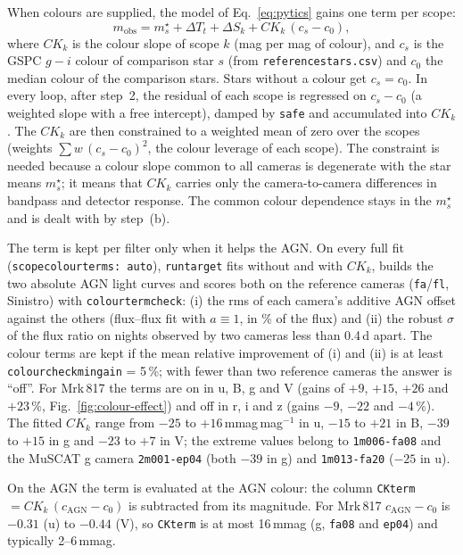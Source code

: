 \documentclass[10pt,a4paper,oneside]{report}
\renewcommand{\_}{\oldunderscore\allowbreak}
\begin{document}
When colours are supplied, the model of Eq.~\ref{eq:pytics} gains one term per scope:
\begin{equation}
  m_\mathrm{obs} = m^\star_s + \Delta T_t + \Delta S_k + CK_k\,(c_s - c_0) ,
  \label{eq:ck}
\end{equation}
where $CK_k$ is the colour slope of scope $k$ (mag per mag of colour), and $c_s$ is the GSPC $g-i$ colour of comparison star $s$ (from \texttt{reference\_stars.csv}) and
$c_0$ the median colour of the comparison stars. Stars without a colour get $c_s = c_0$. In every
loop, after step~2, the residual of each scope is regressed on $c_s - c_0$ (a weighted slope with a
free intercept), damped by \texttt{safe} and accumulated into $CK_k$. The $CK_k$ are then constrained
to a weighted mean of zero over the scopes (weights $\sum w\,(c_s-c_0)^2$, the colour leverage of each
scope). The constraint is needed because a colour slope common to all cameras is degenerate with the
star means $m^\star_s$; it means that $CK_k$ carries only the camera-to-camera differences in bandpass
and detector response. The common colour dependence stays in the $m^\star_s$ and is dealt with by
step~(b).

The term is kept per filter only when it helps the AGN. On every full fit
(\texttt{scope\_colour\_terms: auto}), \texttt{run\_target} fits without and with $CK_k$, builds the two
absolute AGN light curves and scores both on the reference cameras (\texttt{fa}/\texttt{fl}, Sinistro)
with \texttt{colour\_term\_check}: (i) the rms of each camera's additive AGN offset against the others
(flux--flux fit with $a\equiv1$, in \% of the flux) and (ii) the robust $\sigma$ of the flux ratio on
nights observed by two cameras less than 0.4\,d apart. The colour terms are kept if the mean relative
improvement of (i) and (ii) is at least \texttt{colour\_check\_min\_gain} = 5\,\%; with fewer than
two reference cameras the answer is ``off''. For Mrk\,817 the terms are on in u, B, g and V (gains of
$+9$, $+15$, $+26$ and $+23$\,\%, Fig.~\ref{fig:colour-effect}) and off in r, i and z (gains $-9$, $-22$ and $-4$\,\%).
The fitted $CK_k$ range from $-25$ to $+16$\,mmag\,mag$^{-1}$ in u, $-15$ to $+21$ in B, $-39$ to $+15$
in g and $-23$ to $+7$ in V; the extreme values belong to \texttt{1m006-fa08} and the MuSCAT g camera
\texttt{2m001-ep04} (both $-39$ in g) and \texttt{1m013-fa20} ($-25$ in u).

On the AGN the term is evaluated at the AGN colour: the column \texttt{CKterm} $= CK_k\,(c_\mathrm{AGN}-c_0)$
is subtracted from its magnitude. For Mrk\,817 $c_\mathrm{AGN}-c_0$ is $-0.31$ (u) to $-0.44$ (V), so
\texttt{CKterm} is at most 16\,mmag (g, \texttt{fa08} and \texttt{ep04}) and typically 2--6\,mmag.
\end{document}
